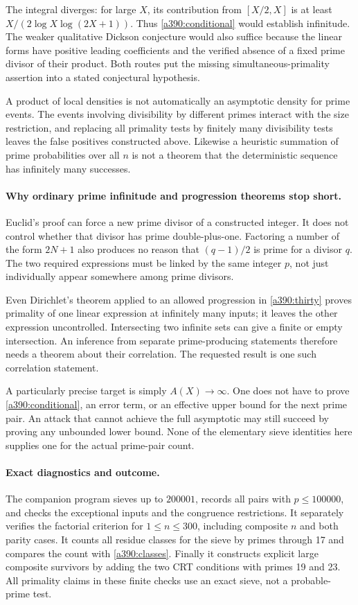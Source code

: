 \documentclass[11pt]{article}
\begin{document}
The integral diverges: for large $X$, its contribution from $[X/2,X]$ is at least $X/(2\log X\log(2X+1))$. Thus \eqref{a390:conditional} would establish infinitude. The weaker qualitative Dickson conjecture would also suffice because the linear forms have positive leading coefficients and the verified absence of a fixed prime divisor of their product. Both routes put the missing simultaneous-primality assertion into a stated conjectural hypothesis.

A product of local densities is not automatically an asymptotic density for prime events. The events involving divisibility by different primes interact with the size restriction, and replacing all primality tests by finitely many divisibility tests leaves the false positives constructed above. Likewise a heuristic summation of prime probabilities over all $n$ is not a theorem that the deterministic sequence has infinitely many successes.

\paragraph{Why ordinary prime infinitude and progression theorems stop short.}
Euclid's proof can force a new prime divisor of a constructed integer. It does not control whether that divisor has prime double-plus-one. Factoring a number of the form $2N+1$ also produces no reason that $(q-1)/2$ is prime for a divisor $q$. The two required expressions must be linked by the same integer $p$, not just individually appear somewhere among prime divisors.

Even Dirichlet's theorem applied to an allowed progression in \eqref{a390:thirty} proves primality of one linear expression at infinitely many inputs; it leaves the other expression uncontrolled. Intersecting two infinite sets can give a finite or empty intersection. An inference from separate prime-producing statements therefore needs a theorem about their correlation. The requested result is one such correlation statement.

A particularly precise target is simply $A(X)\to\infty$. One does not have to prove \eqref{a390:conditional}, an error term, or an effective upper bound for the next prime pair. An attack that cannot achieve the full asymptotic may still succeed by proving any unbounded lower bound. None of the elementary sieve identities here supplies one for the actual prime-pair count.

\paragraph{Exact diagnostics and outcome.}
The companion program sieves up to $200001$, records all pairs with $p\leq100000$, and checks the exceptional inputs and the congruence restrictions. It separately verifies the factorial criterion for $1\leq n\leq300$, including composite $n$ and both parity cases. It counts all residue classes for the sieve by primes through 17 and compares the count with \eqref{a390:classes}. Finally it constructs explicit large composite survivors by adding the two CRT conditions with primes 19 and 23. All primality claims in these finite checks use an exact sieve, not a probable-prime test.
\end{document}
